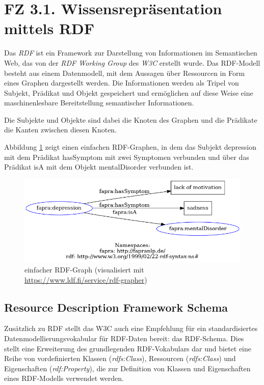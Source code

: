 %
%
\section{FZ 3.1. Wissensrepräsentation mittels RDF}
\label{sec:fz3.1.} 

Das \emph{\ac{RDF}} \cite{w3c_all_2022} ist ein Framework zur Darstellung von Informationen im Semantischen Web, das von der \emph{RDF Working Group} des \emph{\ac{W3C}} erstellt wurde. Das RDF-Modell besteht aus einem Datenmodell, mit dem Aussagen über Ressourcen in Form eines Graphen dargestellt werden. Die Informationen werden als Tripel von Subjekt, Prädikat und Objekt gespeichert und ermöglichen auf diese Weise eine maschinenlesbare Bereitstellung semantischer Informationen.

Die Subjekte und Objekte sind dabei die Knoten des Graphen und die Prädikate die Kanten zwischen diesen Knoten.

Abbildung \ref{fig:rdfgraph} zeigt einen einfachen RDF-Graphen, in dem das Subjekt \glqq depression\grqq{} mit dem Prädikat \glqq hasSymptom\grqq{} mit zwei Symptomen verbunden und über das Prädikat \glqq isA\grqq{} mit dem Objekt \glqq mentalDisorder\grqq{} verbunden ist.

\begin{figure}[h]
    \centering
    \includegraphics[width=\textwidth]{pictures/rdf-graph.png}
    \caption{einfacher RDF-Graph (visualisiert mit \url{https://www.ldf.fi/service/rdf-grapher})}
    \label{fig:rdfgraph}
\end{figure}

\subsection{Resource Description Framework Schema}

Zusätzlich zu RDF stellt das W3C auch eine Empfehlung für ein standardisiertes Datenmodellierungsvokabular für RDF-Daten bereit: das RDF-Schema. Dies stellt eine Erweiterung des grundlegenden RDF-Vokabulars dar und bietet eine Reihe von vordefinierten Klassen (\emph{rdfs:Class}), Ressourcen (\emph{rdfs:Class}) und Eigenschaften (\emph{rdf:Property}), die zur Definition von Klassen und Eigenschaften eines RDF-Modells verwendet werden.

